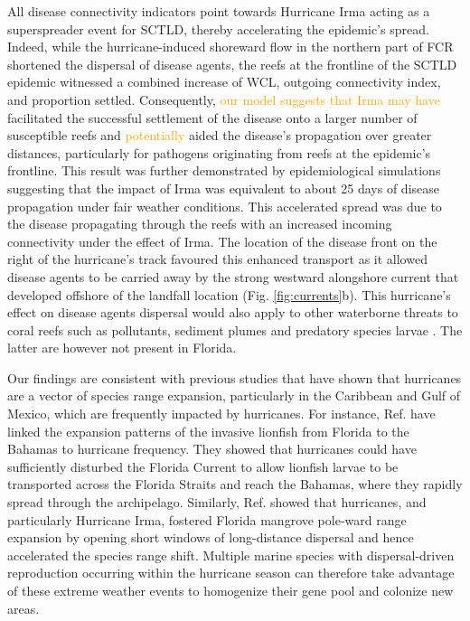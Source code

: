 \documentclass[fleqn,10pt]{wlscirep}
\newcommand{\modif}[1]{\textcolor{orange}{#1}}
\begin{document}
All disease connectivity indicators point towards Hurricane Irma acting as a superspreader event for SCTLD, thereby accelerating the epidemic's spread. Indeed, while the hurricane-induced shoreward flow in the northern part of FCR shortened the dispersal of disease agents, the reefs at the frontline of the SCTLD epidemic witnessed a combined increase of WCL, outgoing connectivity index, and proportion settled. Consequently, \modif{our model suggests that Irma may have} facilitated the successful settlement of the disease onto a larger number of susceptible reefs and \modif{potentially} aided the disease's propagation over greater distances, particularly for pathogens originating from reefs at the epidemic's frontline. This result was further demonstrated by epidemiological simulations suggesting that the impact of Irma was equivalent to about 25 days of disease propagation under fair weather conditions. This accelerated spread was due to the disease propagating through the reefs with an increased incoming connectivity under the effect of Irma. The location of the disease front on the right of the hurricane's track favoured this enhanced transport as it allowed disease agents to be carried away by the strong westward alongshore current that developed offshore of the landfall location (Fig. \ref{fig:currents}b). This hurricane's effect on disease agents dispersal would also apply to other waterborne threats to coral reefs such as pollutants, sediment plumes and predatory species larvae \citep{pratchett2017thirty}. The latter are however not present in Florida.

Our findings are consistent with previous studies that have shown that hurricanes are a vector of species range expansion, particularly in the Caribbean and Gulf of Mexico, which are frequently impacted by hurricanes. For instance, Ref. \cite{Johnston2015hurricanes} have linked the expansion patterns of the invasive lionfish from Florida to the Bahamas to hurricane frequency. They showed that hurricanes could have sufficiently disturbed the Florida Current to allow lionfish larvae to be transported across the Florida Straits and reach the Bahamas, where they rapidly spread through the archipelago. Similarly, Ref. \cite{kennedy2020hurricanes} showed that hurricanes, and particularly Hurricane Irma, fostered Florida mangrove pole-ward range expansion by opening short windows of long-distance dispersal and hence accelerated the species range shift.  Multiple marine species with dispersal-driven reproduction occurring within the hurricane season can therefore take advantage of these extreme weather events to homogenize their gene pool and colonize new areas.
\end{document}
